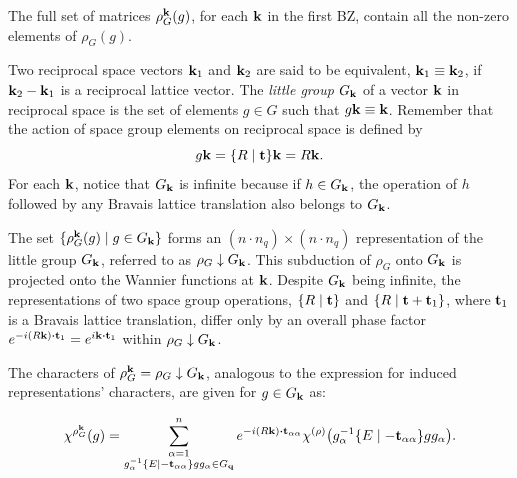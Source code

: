 The full set of matrices $\rho_G^{\vb{k}}(g)$, for each ${\vb{k}}$ in the first BZ, contain all the non-zero elements of $\rho_G(g)$.


\begin{definition}
Two reciprocal space vectors ${\vb{k}}_1$ and ${\vb{k}}_2$ are said to be equivalent, ${\vb{k}}_1 \equiv {\vb{k}}_2$, if ${\vb{k}}_2 - {\vb{k}}_1$ is a reciprocal lattice vector. The \textit{little group} $G_{\vb{k}}$ of a vector ${\vb{k}}$ in reciprocal space is the set of elements $g \in G$ such that $g {\vb{k}} \equiv {\vb{k}}$. Remember that the action of space group elements on reciprocal space is defined by
$$
g{\vb{k}} = \{ R \mid {\vb{t}} \}{\vb{k}} = R{\vb{k}}.
$$
For each ${\vb{k}}$, notice that $G_{\vb{k}}$ is infinite because if $h \in G_{\vb{k}}$, the operation of $h$ followed by any Bravais lattice translation also belongs to $G_{\vb{k}}$.
\end{definition}

\n

The set \(\{\rho_G^{\vb{k}}(g) \mid g \in G_{\vb{k}}\}\) forms an \((n \cdot n_q) \times (n \cdot n_q)\) representation of the little group \(G_{\vb{k}}\), referred to as \(\rho_G \downarrow G_{\vb{k}}\). This subduction of \(\rho_G\) onto \(G_{\vb{k}}\) is projected onto the Wannier functions at \({\vb{k}}\). Despite \(G_{\vb{k}}\) being infinite, the representations of two space group operations, \(\{ R \mid {\vb{t}} \}\) and \(\{ R \mid {\vb{t}} + {\vb{t}}_1 \}\), where \({\vb{t}}_1\) is a Bravais lattice translation, differ only by an overall phase factor \(e^{-i(R\k) \vdot \t_1} = e^{i\k \vdot \t_1}\) within \(\rho_G \downarrow G_{\vb{k}}\).

The characters of \(\rho_G^{\vb{k}} = \rho_G \downarrow G_{\vb{k}}\), analogous to the expression for induced representations' characters, are given for \(g \in G_{\vb{k}}\) as:

\begin{equation} \label{eq:}
\chi^{\rho_G^\k}(g) =
\sum_{\substack{\alpha=1 \\ g_\alpha^{-1}\sg{E}{-\t_{\alpha\alpha}}g g_\alpha \in G_\q}}^n e^{-i(R\k)\vdot\t_{\alpha\alpha}}
\chi^{(\rho)}\qty(g_\alpha^{-1}\sg{E}{-\t_{\alpha\alpha}}g g_\alpha).
\end{equation}


